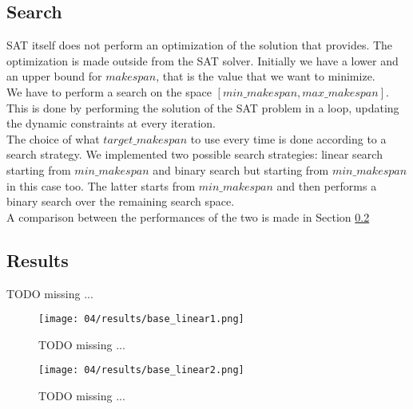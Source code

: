 
\subsection{Search}\label{subsec:SAT_search}
  SAT itself does not perform an optimization of the solution that provides.
  The optimization is made outside from the SAT solver. Initially we have a lower and an upper bound
  for \(makespan\), that is the value that we want to minimize.\\

  We have to perform a search on the space \([min\_makespan, max\_makespan]\). This is done by performing
  the solution of the SAT problem in a loop, updating the dynamic constraints at every iteration.\\

  The choice of what \(target\_makespan\) to use every time is done according to a search strategy.
  We implemented two possible search strategies: linear search starting from \(min\_makespan\) and
  binary search but starting from \(min\_makespan\) in this case too.
  The latter starts from \(min\_makespan\) and then performs a binary search over the remaining
  search space.\\

  A comparison between the performances of the two is made in Section \ref{subsec:SAT_results}


\subsection{Results}\label{subsec:SAT_results}
    \colorbox{BurntOrange}{TODO missing ...}

    \begin{figure}[H]
      \centering
      \texttt{[image: 04/results/base\_linear1.png]}
      \caption{
        \colorbox{BurntOrange}{TODO missing ...}
      }
      \label{fig:SAT_results_base_linear1}
    \end{figure}
    \begin{figure}[H]
      \centering
      \texttt{[image: 04/results/base\_linear2.png]}
      \caption{
        \colorbox{BurntOrange}{TODO missing ...}
      }
      \label{fig:SAT_results_base_linear2}
    \end{figure}

